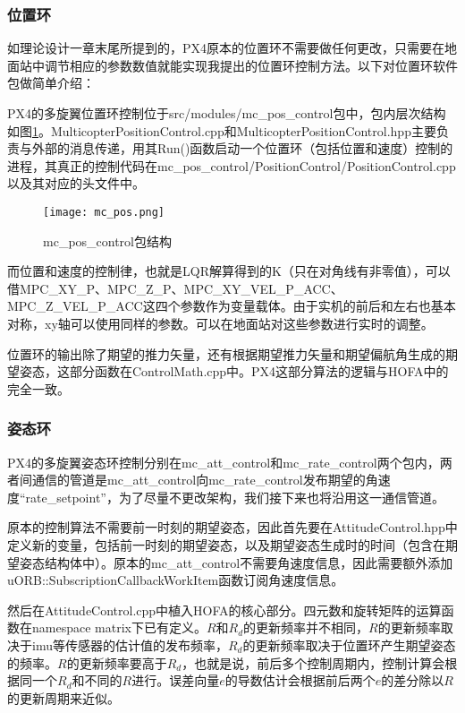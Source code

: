 \subsubsection*{位置环}

如理论设计一章末尾所提到的，PX4原本的位置环不需要做任何更改，只需要在地面站中调节相应的参数数值就能实现我提出的位置环控制方法。以下对位置环软件包做简单介绍：

PX4的多旋翼位置环控制位于src/modules/mc\_pos\_control包中，包内层次结构如图\ref{mc_pos}。MulticopterPositionControl.cpp和MulticopterPositionControl.hpp主要负责与外部的消息传递，用其Run()函数启动一个位置环（包括位置和速度）控制的进程，其真正的控制代码在mc\_pos\_control/PositionControl/PositionControl.cpp以及其对应的头文件中。

\begin{figure}[!h]
  \centering
  \texttt{[image: mc\_pos.png]}
  \caption{mc\_pos\_control包结构}
  \label{mc_pos}
\end{figure}

而位置和速度的控制律，也就是LQR解算得到的K（只在对角线有非零值），可以借MPC\_XY\_P、MPC\_Z\_P、MPC\_XY\_VEL\_P\_ACC、MPC\_Z\_VEL\_P\_ACC这四个参数作为变量载体。由于实机的前后和左右也基本对称，xy轴可以使用同样的参数。可以在地面站对这些参数进行实时的调整。

位置环的输出除了期望的推力矢量，还有根据期望推力矢量和期望偏航角生成的期望姿态，这部分函数在ControlMath.cpp中。PX4这部分算法的逻辑与HOFA中的完全一致。

\subsubsection*{姿态环}

PX4的多旋翼姿态环控制分别在mc\_att\_control和mc\_rate\_control两个包内，两者间通信的管道是mc\_att\_control向mc\_rate\_control发布期望的角速度“rate\_setpoint”，为了尽量不更改架构，我们接下来也将沿用这一通信管道。

原本的控制算法不需要前一时刻的期望姿态，因此首先要在AttitudeControl.hpp中定义新的变量，包括前一时刻的期望姿态，以及期望姿态生成时的时间（包含在期望姿态结构体中）。原本的mc\_att\_control不需要角速度信息，因此需要额外添加uORB::SubscriptionCallbackWorkItem函数订阅角速度信息。

然后在AttitudeControl.cpp中植入HOFA的核心部分。四元数和旋转矩阵的运算函数在namespace matrix下已有定义。$R$和$R_d$的更新频率并不相同，$R$的更新频率取决于imu等传感器的估计值的发布频率，$R_d$的更新频率取决于位置环产生期望姿态的频率。$R$的更新频率要高于$R_d$，也就是说，前后多个控制周期内，控制计算会根据同一个$R_d$和不同的$R$进行。误差向量$e$的导数估计会根据前后两个$e$的差分除以$R$的更新周期来近似。

